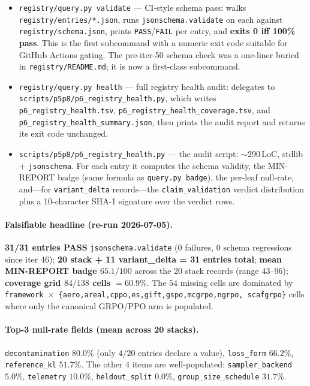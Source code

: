 \begin{itemize}
\item \texttt{registry/query.py validate} --- CI-style schema pass:
walks \texttt{registry/entries/*.json}, runs
\texttt{jsonschema.validate} on each against \texttt{registry/schema.json},
prints \texttt{PASS}/\texttt{FAIL} per entry, and \textbf{exits 0 iff
100\% pass}. This is the first subcommand with a numeric exit code
suitable for GitHub Actions gating. The pre-iter-50 schema check was
a one-liner buried in \texttt{registry/README.md}; it is now a
first-class subcommand.
\item \texttt{registry/query.py health} --- full registry health
audit: delegates to \texttt{scripts/p5p8/p6\_registry\_health.py},
which writes \texttt{p6\_registry\_health.tsv},
\texttt{p6\_registry\_health\_coverage.tsv}, and
\texttt{p6\_registry\_health\_summary.json}, then prints the audit
report and returns its exit code unchanged.
\item \texttt{scripts/p5p8/p6\_registry\_health.py} --- the audit
script: $\sim$290\,LoC, stdlib + \texttt{jsonschema}. For each entry
it computes the schema validity, the MIN-REPORT badge (same formula
as \texttt{query.py badge}), the per-leaf null-rate, and---for
\texttt{variant\_delta} records---the \texttt{claim\_validation}
verdict distribution plus a 10-character SHA-1 signature over the
verdict rows.
\end{itemize}

\paragraph{Falsifiable headline (re-run 2026-07-05).}
\textbf{31/31 entries PASS} \texttt{jsonschema.validate}
(0 failures, 0 schema regressions since iter 46);
\textbf{20 stack + 11 variant\_delta = 31 entries total};
\textbf{mean MIN-REPORT badge $65.1/100$} across the 20 stack records
(range $43$--$96$);
\textbf{coverage grid $84/138$ cells $=60.9\%$}.
The $54$ missing cells are dominated by
\texttt{framework $\times$ \{aero,areal,cppo,es,gift,gspo,mcgrpo,ngrpo,
scafgrpo\}} cells where only the canonical GRPO/PPO arm is populated.

\paragraph{Top-3 null-rate fields (mean across 20 stacks).}
\texttt{decontamination} $80.0\%$ (only $4/20$ entries declare a
value), \texttt{loss\_form} $66.2\%$, \texttt{reference\_kl} $51.7\%$.
The other 4 items are well-populated:
\texttt{sampler\_backend} $5.0\%$, \texttt{telemetry} $10.0\%$,
\texttt{heldout\_split} $0.0\%$, \texttt{group\_size\_schedule}
$31.7\%$.

